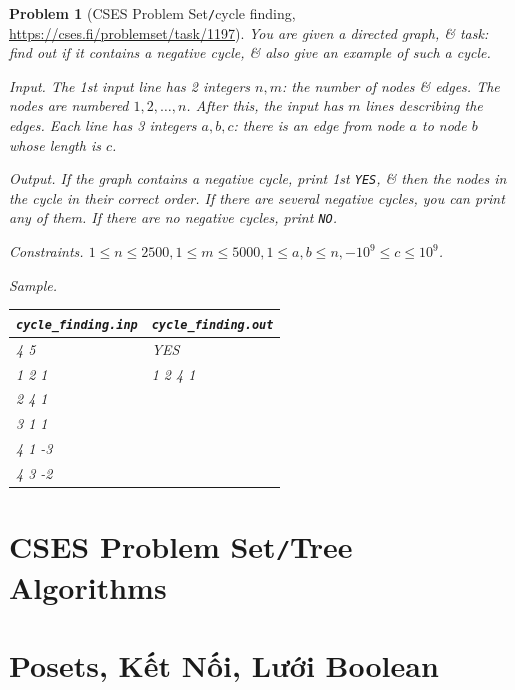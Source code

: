 \documentclass[oneside]{book}
\newtheorem{problem}{Problem}
\begin{document}
\begin{problem}[CSES Problem Set{\tt/}cycle finding, \url{https://cses.fi/problemset/task/1197}]
	You are given a directed graph, \& task: find out if it contains a negative cycle, \& also give an example of such a cycle.
	\item {\sf Input.} The 1st input line has 2 integers $n,m$: the number of nodes \& edges. The nodes are numbered $1,2,\ldots,n$. After this, the input has $m$ lines describing the edges. Each line has 3 integers $a,b,c$: there is an edge from node $a$ to node $b$ whose length is $c$.
	\item {\sf Output.} If the graph contains a negative cycle, print 1st {\tt YES}, \& then the nodes in the cycle in their correct order. If there are several negative cycles, you can print any of them. If there are no negative cycles, print {\tt NO}.
	\item {\sf Constraints.} $1\le n\le2500,1\le m\le5000,1\le a,b\le n,-10^9\le c\le10^9$.
	\item {\sf Sample.}
	\begin{table}[H]
		\centering
		\begin{tabular}{|l|l|}
			\hline
			\verb|cycle_finding.inp| & \verb|cycle_finding.out| \\
			\hline
			4 5 & YES \\
			1 2 1 & 1 2 4 1 \\
			2 4 1 & \\
			3 1 1 & \\
			4 1 -3 & \\
			4 3 -2 & \\
			\hline
		\end{tabular}
	\end{table}
\end{problem}


\chapter{CSES Problem Set{\tt/}Tree Algorithms}


\chapter{Posets, Kết Nối, Lưới Boolean}
\end{document}
